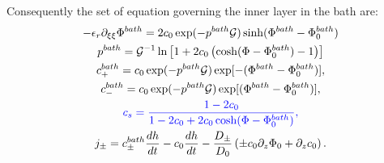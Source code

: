 \documentclass[12pt]{extarticle}
\begin{document}
Consequently the set of equation governing the inner layer in the bath are:
\begin{gather}
-\epsilon_r\partial_{\xi\xi} \Phi^{bath} = 2c_0\exp(-p^{bath}\mathcal{G}) \sinh(\Phi^{bath}-\Phi_0^{bath})\\
p^{bath} = \mathcal{G}^{-1}\ln\left[1+2c_0\left(\cosh(\Phi-\Phi_0^{bath})-1\right)\right] \\
c^{bath}_+ = c_0\exp(-p^{bath}\mathcal{G})\exp[-(\Phi^{bath}-\Phi_0^{bath})],\\
c^{bath}_- = c_0\exp(-p^{bath}\mathcal{G}) \exp[(\Phi^{bath}-\Phi_0^{bath})],\\
\color{blue}c_s = \frac{1-2c_0}{1-2c_0+2c_0\cosh(\Phi-\Phi^{bath}_0)},\\
j_\pm=c^{bath}_\pm\frac{dh}{dt}- c_0 \frac{dh}{dt}  -\frac{D_\pm}{D_0}\left(\pm c_0 \partial_z \Phi_0+\partial_z c_0\right).
\end{gather}
\end{document}
